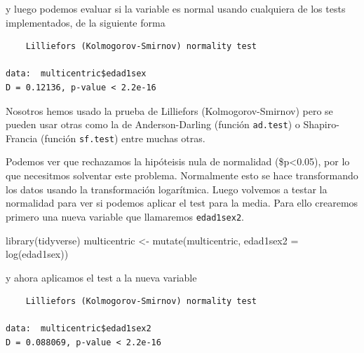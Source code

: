 \documentclass[
]{book}
\newenvironment{Shaded}{\begin{snugshade}}{\end{snugshade}}
\newcommand{\AttributeTok}[1]{\textcolor[rgb]{0.77,0.63,0.00}{#1}}
\newcommand{\FunctionTok}[1]{\textcolor[rgb]{0.00,0.00,0.00}{#1}}
\newcommand{\NormalTok}[1]{#1}
\newcommand{\OtherTok}[1]{\textcolor[rgb]{0.56,0.35,0.01}{#1}}
\newcommand{\SpecialCharTok}[1]{\textcolor[rgb]{0.00,0.00,0.00}{#1}}
\begin{document}
y luego podemos evaluar si la variable es normal usando cualquiera de los tests implementados, de la siguiente forma

\begin{Shaded}
\end{Shaded}

\begin{verbatim}
    Lilliefors (Kolmogorov-Smirnov) normality test

data:  multicentric$edad1sex
D = 0.12136, p-value < 2.2e-16
\end{verbatim}

Nosotros hemos usado la prueba de Lilliefors (Kolmogorov-Smirnov) pero se pueden usar otras como la de Anderson-Darling (función \texttt{ad.test}) o Shapiro-Francia (función \texttt{sf.test}) entre muchas otras.

Podemos ver que rechazamos la hipóteisis nula de normalidad (\$p\textless0.05), por lo que necesitmos solventar este problema. Normalmente esto se hace transformando los datos usando la transformación logarítmica. Luego volvemos a testar la normalidad para ver si podemos aplicar el test para la media. Para ello crearemos primero una nueva variable que llamaremos \texttt{edad1sex2}.

\begin{Shaded}
\begin{Highlighting}[]
\FunctionTok{library}\NormalTok{(tidyverse)}
\NormalTok{multicentric }\OtherTok{\textless{}{-}} \FunctionTok{mutate}\NormalTok{(multicentric, }\AttributeTok{edad1sex2 =} \FunctionTok{log}\NormalTok{(edad1sex))}
\end{Highlighting}
\end{Shaded}

y ahora aplicamos el test a la nueva variable

\begin{Shaded}
\end{Shaded}

\begin{verbatim}
    Lilliefors (Kolmogorov-Smirnov) normality test

data:  multicentric$edad1sex2
D = 0.088069, p-value < 2.2e-16
\end{verbatim}
\end{document}
